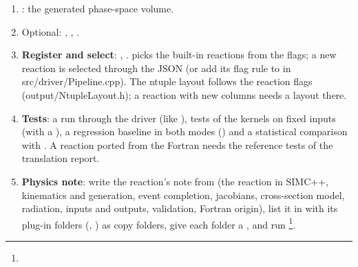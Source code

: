 \begin{enumerate}
); return
false when the event cannot contribute unless  (the central event).
\item \textbf{}: the generated phase-space volume.
\item Optional: , , .
\item \textbf{Register and select}: , .  picks the built-in reactions from the 
flags; a new reaction is selected through the JSON (or add its flag rule to  in src/\allowbreak{}driver/\allowbreak{}Pipeline.\allowbreak{}cpp).
The ntuple layout follows the reaction flags (output/\allowbreak{}NtupleLayout.\allowbreak{}h); a reaction with new columns needs a layout there.
\item \textbf{Tests}: a run through the driver (like ), tests of the kernels on fixed inputs (with a
), a regression baseline in both modes () and a statistical comparison with
. A reaction ported from the Fortran needs the reference tests of the translation report.
\item \textbf{Physics note}: write the reaction's note from  (the reaction in
SIMC++, kinematics and generation, event completion, jacobians, cross-section model, radiation, inputs and outputs,
validation, Fortran origin), list it in  with its plug-in folders (,
) as copy folders, give each folder a , and run
\footnote{}.
\end{enumerate}

